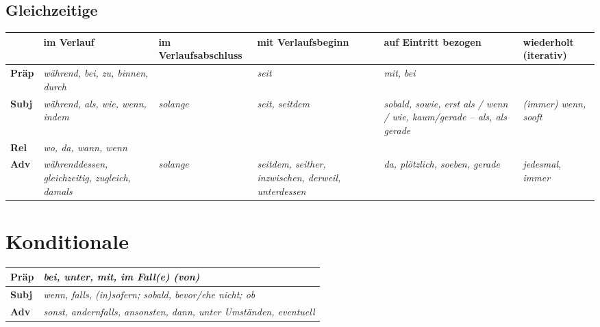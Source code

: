 \documentclass[UTF8]{report}
\begin{document}
\subsection{Gleichzeitige}
\begin{adjustbox}{width=\textwidth}
\begin{tabular}{|>{\raggedright\arraybackslash}p{1cm}|
                >{\raggedright\arraybackslash}p{2.8cm}|
                >{\raggedright\arraybackslash}p{2.8cm}|
                >{\raggedright\arraybackslash}p{2.8cm}|
                >{\raggedright\arraybackslash}p{2.8cm}|
                >{\raggedright\arraybackslash}p{2.8cm}|}
\hline
\textbf{} &
\textbf{im Verlauf} &
\textbf{im Verlaufs\-abschluss} &
\textbf{mit Verlaufs\-beginn} &
\textbf{auf Eintritt bezogen} &
\textbf{wiederholt (iterativ)} \\
\hline
\textbf{Präp} &
\textit{während, bei, zu, binnen, durch} & 
& 
\textit{seit} & 
\textit{mit, bei} & 
\\
\hline
\textbf{Subj} &
\textit{während, als, wie, wenn, indem} &
\textit{solange} &
\textit{seit, seitdem} &
\textit{sobald, sowie, erst als / wenn / wie, kaum/gerade -- als, als gerade} &
\textit{(immer) wenn, sooft} \\
\hline
\textbf{Rel} &
\textit{wo, da, wann, wenn} &
 & 
 & 
 & 
 \\
\hline
\textbf{Adv} &
\textit{währenddessen, gleichzeitig, zugleich, damals} &
\textit{solange} &
\textit{seitdem, seither, inzwischen, derweil, unterdessen} &
\textit{da, plötzlich, soeben, gerade} &
\textit{jedesmal, immer} \\
\hline
\end{tabular}
\end{adjustbox}

\section{Konditionale}
\begin{longtable}{|>{\raggedright\arraybackslash}p{1cm}|>{\raggedright\arraybackslash}p{12cm}|}

\hline
\textbf{Präp} & \textit{bei, unter, mit, im Fall(e) (von)} \\
\hline
\textbf{Subj} & \textit{wenn, falls, (in)sofern; sobald, bevor/ehe nicht; ob} \\
\hline
\textbf{Adv} & \textit{sonst, andernfalls, ansonsten, dann, unter Umständen, eventuell} \\
\hline

\end{longtable}
\end{document}
